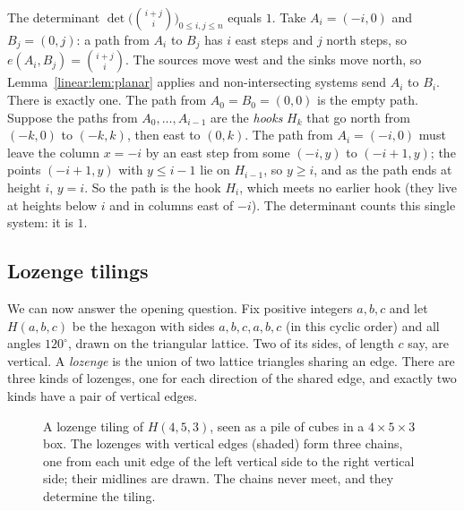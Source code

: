 \begin{example}\label{linear:ex:binomialdet}
The determinant $\det\bigl(\binom{i+j}{i}\bigr)_{0\le i,j\le n}$ equals $1$. Take $A_i=(-i,0)$ and $B_j=(0,j)$: a path from
$A_i$ to $B_j$ has $i$ east steps and $j$ north steps, so $e(A_i,B_j)=\binom{i+j}i$. The sources move west and the sinks
move north, so Lemma~\ref{linear:lem:planar} applies and non-intersecting systems send $A_i$ to $B_i$. There is exactly one.
The path from $A_0=B_0=(0,0)$ is the empty path. Suppose the paths from $A_0,\dots,A_{i-1}$ are the \emph{hooks} $H_k$
that go north from $(-k,0)$ to $(-k,k)$, then east to $(0,k)$. The path from $A_i=(-i,0)$ must leave the column $x=-i$ by
an east step from some $(-i,y)$ to $(-i+1,y)$; the points $(-i+1,y)$ with $y\le i-1$ lie on $H_{i-1}$, so $y\ge i$, and as the
path ends at height $i$, $y=i$. So the path is the hook $H_i$, which meets no earlier hook (they live at heights below
$i$ and in columns east of $-i$). The determinant counts this single system: it is $1$.
\end{example}

\subsection*{Lozenge tilings}

We can now answer the opening question. Fix positive integers $a,b,c$ and let $H(a,b,c)$ be the hexagon with sides
$a,b,c,a,b,c$ (in this cyclic order) and all angles $120^\circ$, drawn on the triangular lattice. Two of its sides, of
length $c$ say, are vertical. A \emph{lozenge} is the union of two lattice triangles sharing an edge. There are three
kinds of lozenges, one for each direction of the shared edge, and exactly two kinds have a pair of vertical edges.

\begin{figure}[ht]
\centering
{}
\caption{A lozenge tiling of $H(4,5,3)$, seen as a pile of cubes in a $4\times5\times3$ box. The lozenges with vertical
edges (shaded) form three chains, one from each unit edge of the left vertical side to the right vertical side; their
midlines are drawn. The chains never meet, and they determine the tiling.}
\label{linear:fig:lozenge}
\end{figure}

